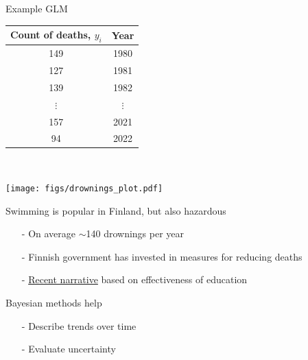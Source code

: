 \documentclass[finnish,english,t]{beamer}
\begin{document}
\begin{frame}{Example GLM}

{\footnotesize\vspace{-1mm}
    \begin{tabular}{c c}
      \vspace{-1mm} Count of deaths, $y_i$ & Year \\
      \hline \vspace{-1mm}
      149 & 1980 \\ \vspace{-1mm}
      127 & 1981 \\ \vspace{-1mm}
      139 & 1982 \\ \vspace{-1mm}
       $\vdots$ & $\vdots$ \\ \vspace{-1mm}
       157 & 2021 \\ \vspace{-1mm}
       94 & 2022
       
    \end{tabular}
  }~\parbox[t][2cm][b]{3.5cm}{\texttt{[image: figs/drownings\_plot.pdf]}}
  \vspace{2mm}
  \pause

  \vspace{-\baselineskip}
  Swimming is popular in Finland, but also hazardous 
    \begin{itemize}
      \item[-] On average $\sim$140 drownings per year
      \item[-] Finnish government has invested in measures for reducing deaths
      \item[-] \href{https://yle.fi/a/74-20048960}{Recent narrative} based on effectiveness of education 
      \end{itemize}
      
  \pause
   Bayesian methods help
    \begin{itemize}
    \item[-] Describe trends over time
    \item[-] Evaluate uncertainty
    \end{itemize}

\end{frame}
\end{document}

